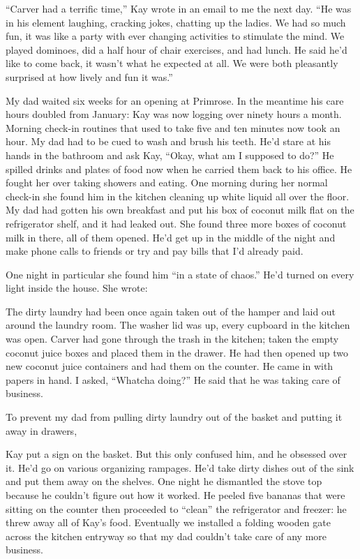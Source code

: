 \documentclass[12pt]{book}
\begin{document}
``Carver had a terrific time,'' Kay wrote in an email to me the next day. ``He was in his element laughing, cracking jokes, chatting up the ladies. We had so much fun, it was like a party with ever changing activities to stimulate the mind. We played dominoes, did a half hour of chair exercises, and had lunch. He said he'd like to come back, it wasn't what he expected at all. We were both pleasantly surprised at how lively and fun it was.''

My dad waited six weeks for an opening at Primrose. In the meantime his care hours doubled from January: Kay was now logging over ninety hours a month. Morning check-in routines that used to take five and ten minutes now took an hour. My dad had to be cued to wash and brush his teeth. He'd stare at his hands in the bathroom and ask Kay, ``Okay, what am I supposed to do?'' He spilled drinks and plates of food now when he carried them back to his office. He fought her over taking showers and eating. One morning during her normal check-in she found him in the kitchen cleaning up white liquid all over the floor. My dad had gotten his own breakfast and put his box of coconut milk flat on the refrigerator shelf, and it had leaked out. She found three more boxes of coconut milk in there, all of them opened. He'd get up in the middle of the night and make phone calls to friends or try and pay bills that I'd already paid.

One night in particular she found him ``in a state of chaos.'' He'd turned on every light inside the house. She wrote:

The dirty laundry had been once again taken out of the hamper and laid out around the laundry room. The washer lid was up, every cupboard in the kitchen was open. Carver had gone through the trash in the kitchen; taken the empty coconut juice boxes and placed them in the drawer. He had then opened up two new coconut juice containers and had them on the counter. He came in with papers in hand. I asked, ``Whatcha doing?'' He said that he was taking care of business.

To prevent my dad from pulling dirty laundry out of the basket and putting it away in drawers,

Kay put a sign on the basket. But this only confused him, and he obsessed over it. He'd go on various organizing rampages. He'd take dirty dishes out of the sink and put them away on the shelves. One night he dismantled the stove top because he couldn't figure out how it worked. He peeled five bananas that were sitting on the counter then proceeded to ``clean'' the refrigerator and freezer: he threw away all of Kay's food. Eventually we installed a folding wooden gate across the kitchen entryway so that my dad couldn't take care of any more business.
\end{document}
